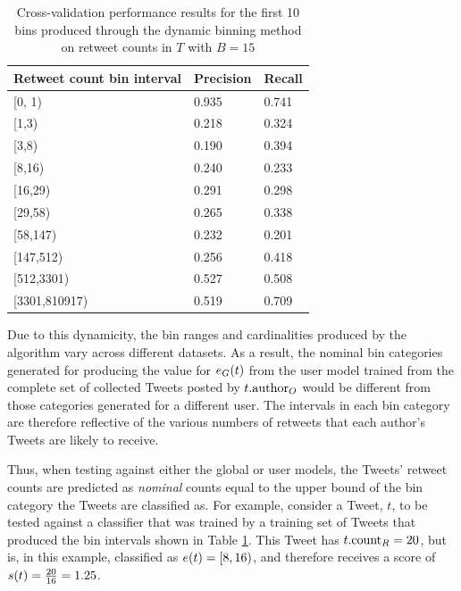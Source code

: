 \begin{table}[h]\footnotesize
\begin{center}
\begin{tabular}{ l | l | l }
	Retweet count bin interval	& Precision & Recall \\
	\hline
	\hline 
    {[0, 1)}           &    0.935   &   0.741\\
    {[1,3)}             &   0.218   &   0.324\\
    {[3,8)}             &   0.190    &   0.394\\
    {[8,16)}            &   0.240   &   0.233\\
    {[16,29)}           &   0.291   &   0.298\\
    {[29,58)}           &   0.265   &   0.338\\
    {[58,147)}          &   0.232   &   0.201\\
    {[147,512)}         &   0.256   &   0.418\\
    {[512,3301)}        &   0.527   &   0.508\\
    {[3301,810917)}     &   0.519   &   0.709\\
    \hline  
\end{tabular}
\end{center}
\caption{Cross-validation performance results for the first 10 bins produced through the dynamic binning method on retweet counts in $T$ with $B=15$}
\label{table:distributed_bin_performance}
\end{table}

Due to this dynamicity, the bin ranges and cardinalities produced by the algorithm vary across different datasets. As a result, the nominal bin categories generated for producing the value for $e_G(t)$ from the user model trained from the complete set of collected Tweets posted by $t.\textrm{author}_O$ would be different from those categories generated for a different user. The intervals in each bin category are therefore reflective of the various numbers of retweets that each author's Tweets are likely to receive. 

Thus, when testing against either the global or user models, the Tweets' retweet counts are predicted as \textit{nominal} counts equal to the upper bound of the bin category the Tweets are classified as. For example, consider a Tweet, $t$, to be tested against a classifier that was trained by a training set of Tweets that produced the bin intervals shown in Table \ref{table:distributed_bin_performance}. This Tweet has $t.\textrm{count}_R = 20$, but is, in this example, classified as $e(t) =  {[8,16)}$, and therefore receives a score of $s(t) = \frac{20}{16} = 1.25$.

